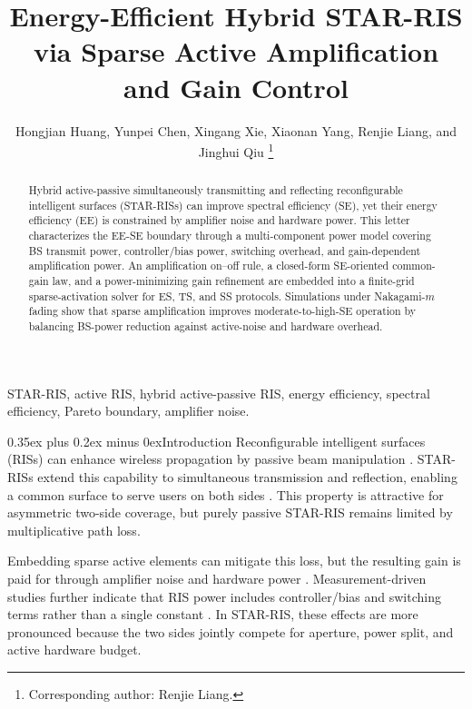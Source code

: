 \documentclass[journal]{IEEEtran}
\makeatletter
\def\section{\@startsection{section}{1}{\z@}{1.2ex plus 0.4ex minus 0.2ex}%
{0.35ex plus 0.2ex minus 0ex}{\normalfont\normalsize\centering\scshape}}%
\makeatother
\begin{document}
\title{Energy-Efficient Hybrid STAR-RIS via Sparse Active Amplification and Gain Control}

\author{Hongjian Huang, Yunpei Chen, Xingang Xie, Xiaonan Yang, Renjie Liang, and Jinghui Qiu%
\thanks{Corresponding author: Renjie Liang.}}
\maketitle


\begin{abstract}
Hybrid active-passive simultaneously transmitting and reflecting reconfigurable intelligent surfaces (STAR-RISs) can improve spectral efficiency (SE), yet their energy efficiency (EE) is constrained by amplifier noise and hardware power. This letter characterizes the EE-SE boundary through a multi-component power model covering BS transmit power, controller/bias power, switching overhead, and gain-dependent amplification power. An amplification on--off rule, a closed-form SE-oriented common-gain law, and a power-minimizing gain refinement are embedded into a finite-grid sparse-activation solver for ES, TS, and SS protocols. Simulations under Nakagami-$m$ fading show that sparse amplification improves moderate-to-high-SE operation by balancing BS-power reduction against active-noise and hardware overhead.
\end{abstract}

\begin{IEEEkeywords}
STAR-RIS, active RIS, hybrid active-passive RIS, energy efficiency, spectral efficiency, Pareto boundary, amplifier noise.
\end{IEEEkeywords}

\section{Introduction}
Reconfigurable intelligent surfaces (RISs) can enhance wireless propagation by passive beam manipulation \cite{wu2019irs}. STAR-RISs extend this capability to simultaneous transmission and reflection, enabling a common surface to serve users on both sides \cite{liu2021star,mu2022star}. This property is attractive for asymmetric two-side coverage, but purely passive STAR-RIS remains limited by multiplicative path loss.

Embedding sparse active elements can mitigate this loss, but the resulting gain is paid for through amplifier noise and hardware power \cite{ma2023activeee,peng2023hybrid,huang2024hybrid,zhang2022signal}. Measurement-driven studies further indicate that RIS power includes controller/bias and switching terms rather than a single constant \cite{wang2023static,wang2024practical}. In STAR-RIS, these effects are more pronounced because the two sides jointly compete for aperture, power split, and active hardware budget.
\end{document}
